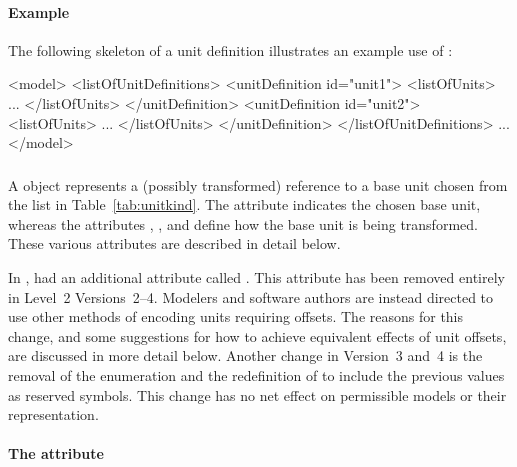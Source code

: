 \paragraph{Example}

The following skeleton of a unit definition illustrates an example
use of \UnitDefinition:

\begin{example}

<model>
    <listOfUnitDefinitions>
        <unitDefinition id="unit1">
            <listOfUnits>
                ...
            </listOfUnits>
        </unitDefinition>
        <unitDefinition id="unit2">
            <listOfUnits>
                ...
            </listOfUnits>
        </unitDefinition>
    </listOfUnitDefinitions>
    ...
</model>
\end{example}


\subsubsection{}
\label{sec:unit-structure}

A \Unit object represents a (possibly transformed) reference to
a base unit chosen from the list in
  Table~\vref{tab:unitkind}.  The attribute
 indicates the chosen base unit, whereas the
attributes , , and
 define how the base unit is being transformed.
These various attributes are described in detail below.

In \sbmltwoone, \Unit had an additional
attribute called .  This
attribute has been removed entirely in Level~2
Versions~2--4.  Modelers and software authors are
instead directed to use other methods of encoding units requiring
offsets.  The reasons for this change, and some suggestions for
how to achieve equivalent effects of unit offsets, are discussed
in more detail below.  Another change in Version~3 and~4 is the
  removal of the enumeration  and the
  redefinition of  to include the previous
   values as reserved symbols.  This change has
  no net effect on permissible models or their representation.


\paragraph{The  attribute}


